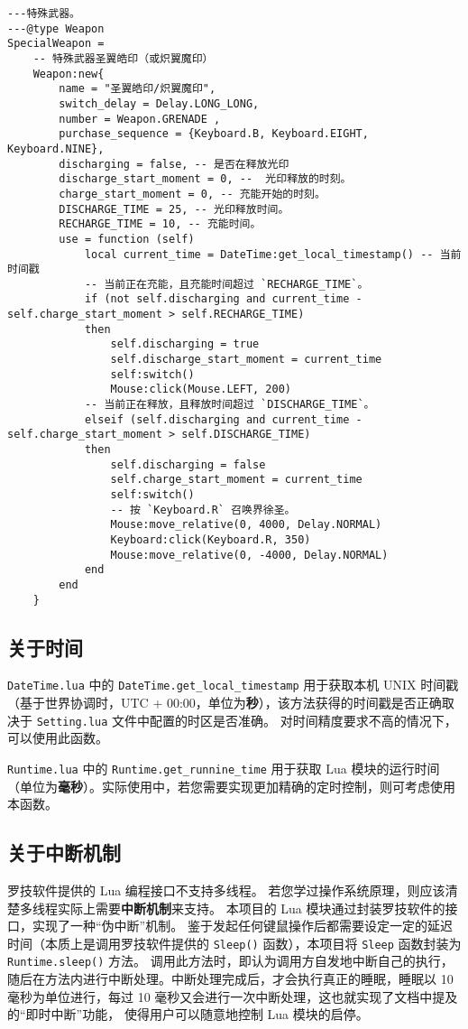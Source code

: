 \begin{verbatim}
---特殊武器。
---@type Weapon
SpecialWeapon =
    -- 特殊武器圣翼皓印（或炽翼魔印）
    Weapon:new{
        name = "圣翼皓印/炽翼魔印",
        switch_delay = Delay.LONG_LONG,
        number = Weapon.GRENADE ,
        purchase_sequence = {Keyboard.B, Keyboard.EIGHT, Keyboard.NINE},
        discharging = false, -- 是否在释放光印
        discharge_start_moment = 0, --  光印释放的时刻。
        charge_start_moment = 0, -- 充能开始的时刻。
        DISCHARGE_TIME = 25, -- 光印释放时间。
        RECHARGE_TIME = 10, -- 充能时间。
        use = function (self)
            local current_time = DateTime:get_local_timestamp() -- 当前时间戳
            -- 当前正在充能，且充能时间超过 `RECHARGE_TIME`。
            if (not self.discharging and current_time - self.charge_start_moment > self.RECHARGE_TIME)
            then
                self.discharging = true
                self.discharge_start_moment = current_time
                self:switch()
                Mouse:click(Mouse.LEFT, 200)
            -- 当前正在释放，且释放时间超过 `DISCHARGE_TIME`。
            elseif (self.discharging and current_time - self.charge_start_moment > self.DISCHARGE_TIME)
            then
                self.discharging = false
                self.charge_start_moment = current_time
                self:switch()
                -- 按 `Keyboard.R` 召唤界徐圣。 
                Mouse:move_relative(0, 4000, Delay.NORMAL)
                Keyboard:click(Keyboard.R, 350)
                Mouse:move_relative(0, -4000, Delay.NORMAL)
            end
        end
    }\end{verbatim}

\subsection{关于时间}

\lstinline{DateTime.lua} 中的 \lstinline{DateTime.get_local_timestamp} 用于获取本机 UNIX 时间戳（基于世界协调时，UTC + 00:00，单位为\textbf{秒}），该方法获得的时间戳是否正确取决于 \lstinline{Setting.lua} 文件中配置的时区是否准确。
对时间精度要求不高的情况下，可以使用此函数。

\lstinline{Runtime.lua} 中的 \lstinline{Runtime.get_runnine_time} 用于获取 Lua 模块的运行时间（单位为\textbf{毫秒}）。实际使用中，若您需要实现更加精确的定时控制，则可考虑使用本函数。

\subsection{关于中断机制}

罗技软件提供的 Lua 编程接口不支持多线程。
若您学过操作系统原理，则应该清楚多线程实际上需要\textbf{中断机制}来支持。
本项目的 Lua 模块通过封装罗技软件的接口，实现了一种“伪中断”机制。
鉴于发起任何键鼠操作后都需要设定一定的延迟时间（本质上是调用罗技软件提供的 \lstinline{Sleep()} 函数），本项目将 \lstinline{Sleep} 函数封装为 \lstinline{Runtime.sleep()} 方法。
调用此方法时，即认为调用方自发地中断自己的执行，随后在方法内进行中断处理。中断处理完成后，才会执行真正的睡眠，睡眠以 10 毫秒为单位进行，每过 10 毫秒又会进行一次中断处理，这也就实现了文档中提及的“即时中断”功能，
使得用户可以随意地控制 Lua 模块的启停。
